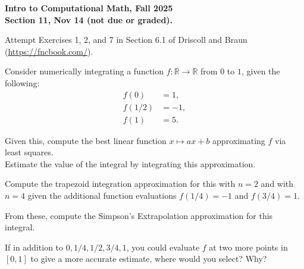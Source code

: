 \documentclass[11pt]{article}
\begin{document}
\begin{center}
{\bf Intro to Computational Math, Fall 2025\\
Section 11, Nov 14 (not due or graded).\\
}
\end{center}


 Attempt Exercises 1, 2, and 7 in Section 6.1 of Driscoll and Braun (\url{https://fncbook.com/}).

\vskip3cm

 Consider numerically integrating a function $f\colon \mathbb{R}\rightarrow \mathbb{R}$ from $0$ to $1$, given the following:
\begin{align*}
    f(0) &= 1,\\
    f(1/2) &= -1,\\
    f(1) &= 5.    
\end{align*}

 Given this, compute the best linear function $x\mapsto ax+b$ approximating $f$ via least squares.\\
Estimate the value of the integral by integrating this approximation.

\vskip3cm

 Compute the trapezoid integration approximation for this with $n=2$ and with $n=4$ given the additional function evaluations $f(1/4) = -1$ and $f(3/4) = 1$.

\vskip3cm

 From these, compute the Simpson's Extrapolation approximation for this integral.

\vskip3cm

 If in addition to $0,1/4,1/2,3/4,1$, you could evaluate $f$ at two more points in $[0,1]$ to give a more accurate estimate, where would you select? Why?
\end{document}
